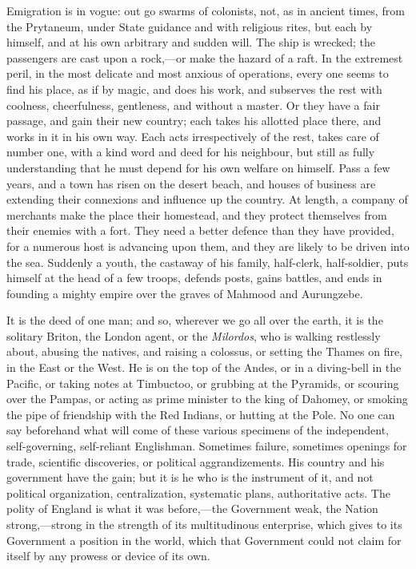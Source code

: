 Emigration is in vogue: out go swarms of
colonists, not, as in ancient times, from the Prytaneum, under State
guidance and with religious rites, but each by himself, and at his own
arbitrary and sudden will. The ship is wrecked; the passengers are
cast upon a rock,—or make the hazard of a raft. In the extremest
peril, in the most delicate and most anxious of operations, every one
seems to find his place, as if by magic, and does his work, and
subserves the rest with coolness, cheerfulness, gentleness, and
without a master. Or they have a fair passage, and gain their new
country; each takes his allotted place there, and works in it in his
own way. Each acts irrespectively of the rest, takes care of number
one, with a kind word and deed for his neighbour, but still as fully
understanding that he must depend for his own welfare on himself. Pass
a few years, and a town has risen on the desert beach, and houses of
business are extending their connexions and influence up the country.
At length, a company of merchants make the place their homestead, and
they protect themselves from their enemies with a fort. They need a
better defence than they have provided, for a numerous host is
advancing upon them, and they are likely to be driven into the sea.
Suddenly a youth, the castaway of his family, half-clerk,
half-soldier, puts himself at the head of a few troops, defends posts,
gains battles, and ends in founding a mighty empire over the graves of
Mahmood and Aurungzebe.

It is the deed of one man; and so, wherever we go
all over the earth, it is the solitary Briton, the London agent, or the \emph{Milordos}, who is walking restlessly about,
abusing the natives, and raising a colossus, or setting the Thames on
fire, in the East or the West. He is on the top of the Andes, or in a
diving-bell in the Pacific, or taking notes at Timbuctoo, or grubbing
at the Pyramids, or scouring over the Pampas, or acting as prime
minister to the king of Dahomey, or smoking the pipe of friendship
with the Red Indians, or hutting at the Pole. No one can say
beforehand what will come of these various specimens of the
independent, self-governing, self-reliant Englishman. Sometimes
failure, sometimes openings for trade, scientific discoveries, or
political aggrandizements. His country and his government have the
gain; but it is he who is the instrument of it, and not political
organization, centralization, systematic plans, authoritative acts.
The polity of England is what it was before,—the Government weak,
the Nation strong,—strong in the strength of its multitudinous
enterprise, which gives to its Government a position in the world,
which that Government could not claim for itself by any prowess or
device of its own.

